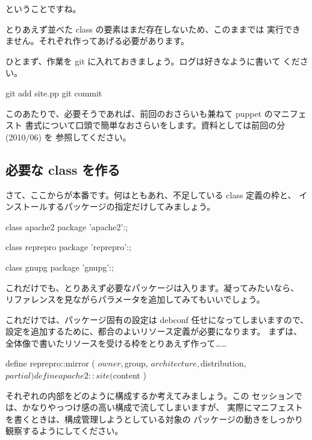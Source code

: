 \documentclass[mingoth,a4paper]{jsarticle}
\begin{document}
ということですね。

とりあえず並べた class の要素はまだ存在しないため、このままでは
実行できません。それぞれ作ってあげる必要があります。

ひとまず、作業を git に入れておきましょう。ログは好きなように書いて
ください。

\begin{commandline}
git add site.pp
git commit
\end{commandline}

このあたりで、必要そうであれば、前回のおさらいも兼ねて puppet のマニフェスト
書式について口頭で簡単なおさらいをします。資料としては前回の分 (2010/06) を
参照してください。

\subsection{必要な class を作る}

さて、ここからが本番です。何はともあれ、不足している class 定義の枠と、
インストールするパッケージの指定だけしてみましょう。

\begin{commandline}
class apache2 {
  package { 'apache2':; }
}

class reprepro {
  package { 'reprepro':; }
}

class gnupg {
  package { 'gnupg':; }
}
\end{commandline}

これだけでも、とりあえず必要なパッケージは入ります。凝ってみたいなら、
リファレンスを見ながらパラメータを追加してみてもいいでしょう。

これだけでは、パッケージ固有の設定は debconf 任せになってしまいますので、
設定を追加するために、都合のよいリソース定義が必要になります。
まずは、全体像で書いたリソースを受ける枠をとりあえず作って……

\begin{commandline}
define reprepro::mirror (
  $owner,
  $group,
  $architecture,
  $distribution,
  $partial
  ) {

}

define apache2::site (
  $content
  ) {

}
\end{commandline}

それぞれの内部をどのように構成するか考えてみましょう。この
セッションでは、かなりやっつけ感の高い構成で流してしまいますが、
実際にマニフェストを書くときは、構成管理しようとしている対象の
パッケージの動きをしっかり観察するようにしてください。
\end{document}
